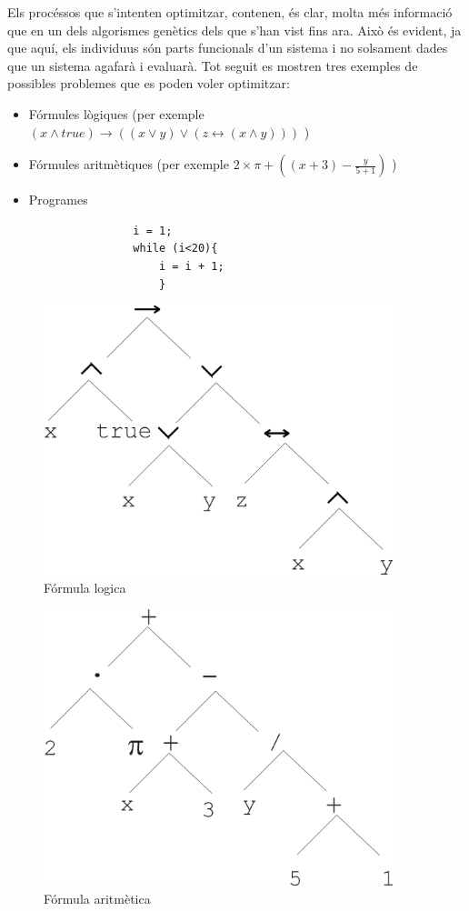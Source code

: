 Els procéssos que s'intenten optimitzar, contenen, és clar, molta més informació
que en un dels algorismes genètics dels que s'han vist fins ara.  Això és
evident, ja que aquí, els individuus són parts funcionals d'un sistema i no
solsament dades que un sistema agafarà i evaluarà.  Tot seguit es mostren tres
exemples de possibles problemes que es poden voler optimitzar:

\begin{itemize}
	\item Fórmules lògiques (per exemple $ (x\land true) \rightarrow ((x \lor y)
	\lor (z \leftrightarrow ( x \land y)))$ )
	\item Fórmules aritmètiques (per exemple $2\times\pi+((x+3)-\frac{y}{5+1})$ )
	\item Programes 
		\begin{verbatim}
				i = 1;
				while (i<20){
					i = i + 1;
					}
		\end{verbatim}
\end{itemize}

\begin{figure} \centering \includegraphics[width=4in]{intro/6-2-2.jpg}
\caption{\label{fig:6-2-2}Fórmula logica}
\end{figure}

\begin{figure} \centering \includegraphics[width=4in]{intro/6-2-1.jpg}
\caption{\label{fig:6-2-1}Fórmula aritmètica}
\end{figure}


